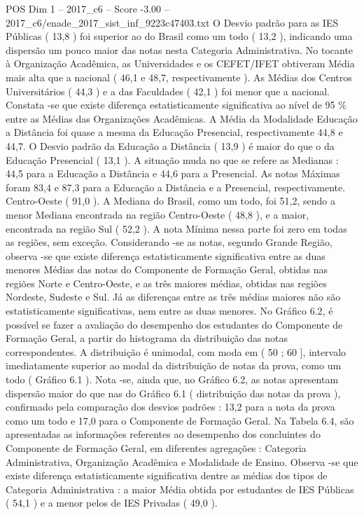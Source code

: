\begin{textsample}{POS Dim 1 – 2017\_c6 – Score -3.00 – 2017\_c6/enade\_2017\_sist\_inf\_9223c47403.txt}
O Desvio padrão para as IES Públicas ( 13,8 ) foi superior ao do Brasil como um todo ( 13,2 ), indicando uma dispersão um pouco maior das notas nesta Categoria Administrativa.
No tocante à Organização Acadêmica, as Universidades e os CEFET/IFET obtiveram Média mais alta que a nacional ( 46,1 e 48,7, respectivamente ).
As Médias dos Centros Universitários ( 44,3 ) e a das Faculdades ( 42,1 ) foi menor que a nacional.
Constata -se que existe diferença estatisticamente significativa ao nível de 95 \% entre as Médias das Organizações Acadêmicas.
A Média da Modalidade Educação a Distância foi quase a mesma da Educação Presencial, respectivamente 44,8 e 44,7.
O Desvio padrão da Educação a Distância ( 13,9 ) é maior do que o da Educação Presencial ( 13,1 ).
A situação muda no que se refere as Medianas : 44,5 para a Educação a Distância e 44,6 para a Presencial.
As notas Máximas foram 83,4 e 87,3 para a Educação a Distância e a Presencial, respectivamente.
Centro-Oeste ( 91,0 ).
A Mediana do Brasil, como um todo, foi 51,2, sendo a menor Mediana encontrada na região Centro-Oeste ( 48,8 ), e a maior, encontrada na região Sul ( 52,2 ).
A nota Mínima nessa parte foi zero em todas as regiões, sem exceção.
Considerando -se as notas, segundo Grande Região, observa -se que existe diferença estatisticamente significativa entre as duas menores Médias das notas do Componente de Formação Geral, obtidas nas regiões Norte e Centro-Oeste, e as três maiores médias, obtidas nas regiões Nordeste, Sudeste e Sul.
Já as diferenças entre as três médias maiores não são estatisticamente significativas, nem entre as duas menores.
No Gráfico 6.2, é possível se fazer a avaliação do desempenho dos estudantes do Componente de Formação Geral, a partir do histograma da distribuição das notas correspondentes.
A distribuição é unimodal, com moda em ( 50 ; 60 ], intervalo imediatamente superior ao modal da distribuição de notas da prova, como um todo ( Gráfico 6.1 ).
Nota -se, ainda que, no Gráfico 6.2, as notas apresentam dispersão maior do que nas do Gráfico 6.1 ( distribuição das notas da prova ), confirmado pela comparação dos desvios padrões : 13,2 para a nota da prova como um todo e 17,0 para o Componente de Formação Geral.
Na Tabela 6.4, são apresentadas as informações referentes ao desempenho dos concluintes do Componente de Formação Geral, em diferentes agregações : Categoria Administrativa, Organização Acadêmica e Modalidade de Ensino.
Observa -se que existe diferença estatisticamente significativa dentre as médias dos tipos de Categoria Administrativa : a maior Média obtida por estudantes de IES Públicas ( 54,1 ) e a menor pelos de IES Privadas ( 49,0 ).

\end{textsample}
